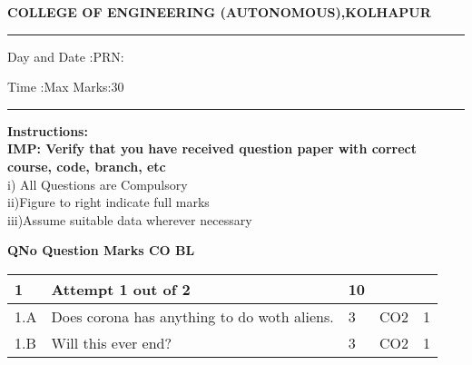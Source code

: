 \documentclass[12pt]{article}
\begin{document}
	\par
	{\bf{COLLEGE OF ENGINEERING (AUTONOMOUS),KOLHAPUR}}
	\par\noindent\rule{\textwidth}{0.4pt}
	
	\par
	\par
	\par
\begin{flushleft}
	Day and Date :{}\hspace{5.5cm}PRN:
\end{flushleft}

\begin{flushleft}
	Time :{}\hspace{7cm}Max Marks:{30}\\
\end{flushleft}
\noindent\rule{\textwidth}{0.1pt}
\begin{flushleft}
	{\bf Instructions:}\\
	{\hspace{0.5cm} \bf IMP: Verify that you have received question paper with correct course, code, branch, etc}\\
	\hspace{1cm}i) All Questions are Compulsory\\
	\hspace{1cm}ii)Figure to right indicate full marks\\
	\hspace{1cm}iii)Assume suitable data wherever necessary\\
\end{flushleft} 

	\begin{flushleft}
	\bf{QNo}\hspace{1.2cm} \bf{Question} \hspace{5.5cm}  \bf{Marks} \hspace{0.2cm} \bf{CO} \hspace{0.2cm}	\bf{BL}	
	
	
	
	
	
	
\end{flushleft}

		

	
	
	\begin{longtable}{|L{1cm}|L{8cm}|C{1cm}|C{1cm}|C{1cm}|}\hline
			\bf1 & \bf{Attempt} \bf1 out of \bf2 & \bf10 & & \\ \hline
				1.A &
	Does corona has anything to do woth aliens. \newline
		 &  3 & CO2 & 1\\ \hline
		1.B &
	Will this ever end? \newline
		 &  3 & CO2 & 1\\ \hline
		\end{longtable}
\end{document}
